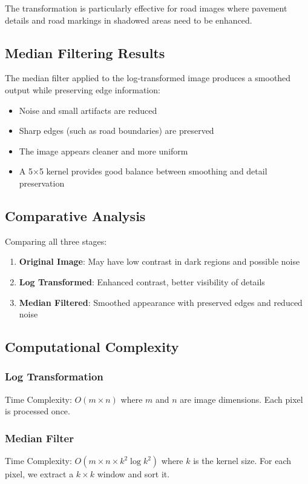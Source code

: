 \documentclass[12pt,a4paper]{article}
\begin{document}
The transformation is particularly effective for road images where pavement details and road markings in shadowed areas need to be enhanced.

\subsection{Median Filtering Results}
The median filter applied to the log-transformed image produces a smoothed output while preserving edge information:

\begin{itemize}
    \item Noise and small artifacts are reduced
    \item Sharp edges (such as road boundaries) are preserved
    \item The image appears cleaner and more uniform
    \item A 5$\times$5 kernel provides good balance between smoothing and detail preservation
\end{itemize}

\subsection{Comparative Analysis}
Comparing all three stages:
\begin{enumerate}
    \item \textbf{Original Image}: May have low contrast in dark regions and possible noise
    \item \textbf{Log Transformed}: Enhanced contrast, better visibility of details
    \item \textbf{Median Filtered}: Smoothed appearance with preserved edges and reduced noise
\end{enumerate}

\subsection{Computational Complexity}
\subsubsection{Log Transformation}
Time Complexity: $O(m \times n)$ where $m$ and $n$ are image dimensions. Each pixel is processed once.

\subsubsection{Median Filter}
Time Complexity: $O(m \times n \times k^2 \log k^2)$ where $k$ is the kernel size. For each pixel, we extract a $k \times k$ window and sort it.
\end{document}
